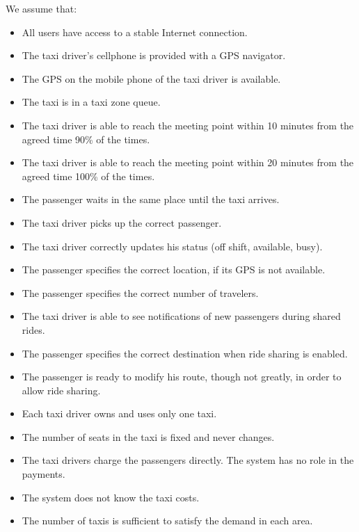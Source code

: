 We assume that:
\begin{itemize}
    \item All users have access to a stable Internet connection.
    \item The taxi driver's cellphone is provided with a GPS navigator.
    \item The GPS on the mobile phone of the taxi driver is available.
    \item The taxi is in a taxi zone queue.
    \item The taxi driver is able to reach the meeting point within 10 minutes from the agreed time 90\% of the times.
    \item The taxi driver is able to reach the meeting point within 20 minutes from the agreed time 100\% of the times.
    \item The passenger waits in the same place until the taxi arrives.
    \item The taxi driver picks up the correct passenger.
    \item The taxi driver correctly updates his status (off shift, available, busy).
    \item The passenger specifies the correct location, if its GPS is not available.
    \item The passenger specifies the correct number of travelers.
    \item The taxi driver is able to see notifications of new passengers during shared rides.
    \item The passenger specifies the correct destination when ride sharing is enabled.
    \item The passenger is ready to modify his route, though not greatly, in order to allow ride sharing.
    \item Each taxi driver owns and uses only one taxi.
    \item The number of seats in the taxi is fixed and never changes.
    \item The taxi drivers charge the passengers directly. The system has no role in the payments.
    \item The system does not know the taxi costs.
    \item The number of taxis is sufficient to satisfy the demand in each area.
\end{itemize}
